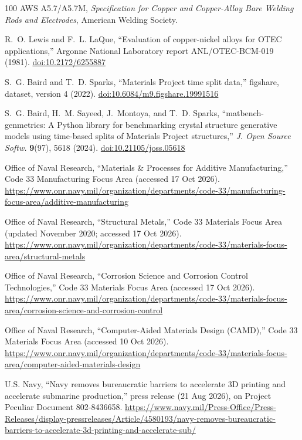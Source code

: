 \documentclass[12pt,letterpaper]{article}
\begin{document}
\begin{thebibliography}{100}
AWS A5.7/A5.7M, \emph{Specification for Copper and Copper-Alloy Bare Welding
Rods and Electrodes}, American Welding Society.

R.~O. Lewis and F.~L. LaQue, ``Evaluation of copper-nickel alloys for OTEC
applications,'' Argonne National Laboratory report ANL/OTEC-BCM-019 (1981).
\href{https://doi.org/10.2172/6255887}{doi:10.2172/6255887}

S.~G. Baird and T.~D. Sparks, ``Materials Project time split data,'' figshare, dataset, version 4 (2022).
\href{https://doi.org/10.6084/m9.figshare.19991516}{doi:10.6084/m9.figshare.19991516}

S.~G. Baird, H.~M. Sayeed, J.~Montoya, and T.~D. Sparks, ``matbench-genmetrics: A Python library for benchmarking crystal structure generative models using time-based splits of Materials Project structures,'' \emph{J. Open Source Softw.} \textbf{9}(97), 5618 (2024).
\href{https://doi.org/10.21105/joss.05618}{doi:10.21105/joss.05618}

Office of Naval Research, ``Materials \& Processes for Additive Manufacturing,'' Code 33 Manufacturing Focus Area (accessed 17 Oct 2026).
\url{https://www.onr.navy.mil/organization/departments/code-33/manufacturing-focus-area/additive-manufacturing}

Office of Naval Research, ``Structural Metals,'' Code 33 Materials Focus Area (updated November 2020; accessed 17 Oct 2026).
\url{https://www.onr.navy.mil/organization/departments/code-33/materials-focus-area/structural-metals}

Office of Naval Research, ``Corrosion Science and Corrosion Control Technologies,'' Code 33 Materials Focus Area (accessed 17 Oct 2026).
\url{https://www.onr.navy.mil/organization/departments/code-33/materials-focus-area/corrosion-science-and-corrosion-control}

Office of Naval Research, ``Computer-Aided Materials Design (CAMD),'' Code 33
Materials Focus Area (accessed 10 Oct 2026).
\url{https://www.onr.navy.mil/organization/departments/code-33/materials-focus-area/computer-aided-materials-design}

U.S. Navy, ``Navy removes bureaucratic barriers to accelerate 3D printing and
accelerate submarine production,'' press release (21 Aug 2026), on Project
Peculiar Document 802-8436658.
\url{https://www.navy.mil/Press-Office/Press-Releases/display-pressreleases/Article/4580193/navy-removes-bureaucratic-barriers-to-accelerate-3d-printing-and-accelerate-sub/}


\end{thebibliography}
\end{document}
